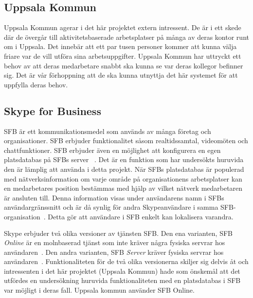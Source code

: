 \documentclass[a4paper,12pt]{article}
\begin{document}
 \subsection{Uppsala Kommun}
 Uppsala Kommun agerar i det här projektet extern intressent. De är i ett skede där de övergår till aktivitetsbaserade arbetsplatser på många av deras kontor runt om i Uppsala. Det innebär att ett par tusen personer kommer att kunna välja friare var de vill utföra sina arbetsuppgifter. Uppsala Kommun har uttryckt ett behov av att deras medarbetare snabbt ska kunna se var deras kollegor befinner sig. Det är vår förhoppning att de ska kunna utnyttja det här systemet för att uppfylla deras behov.

 \subsection{Skype for Business}\label{SFB}
 SFB är ett kommunikationsmedel som används av många företag och organisationer. SFB erbjuder funktionalitet såsom realtidssamtal, videomöten och chattfunktioner. SFB erbjuder även en möjlighet att konfigurera en egen platsdatabas på SFBs server ~\cite{Microsoft-Office}. Det är en funktion som har undersökts huruvida den är lämplig att använda i detta projekt. När SFBs platsdatabas är populerad med nätverksinformation om varje område på organisationens arbetsplatser kan en medarbetares position bestämmas med hjälp av vilket nätverk medarbetaren är ansluten till. Denna information visas under användarens namn i SFBs användargränssnitt och är då synlig för andra Skypeanvändare i samma SFB-organisation~\cite{SFBpresence}. Detta gör att användare i SFB enkelt kan lokalisera varandra.

 Skype erbjuder två olika versioner av tjänsten SFB. Den ena varianten, SFB \textit{Online} är en molnbaserad tjänst som inte kräver några fysiska servrar hos användaren~\cite{SFBonline}.
 Den andra varianten, SFB \textit{Server} kräver fysiska servrar hos användaren~\cite{SFBserver}. Funktionaliteten för de två olika versionerna skiljer sig delvis åt och intressenten i det här projektet (Uppsala Kommun) hade som önskemål att det utfördes en undersökning huruvida funktionaliteten med en platsdatabas i SFB var möjligt i deras fall. Uppsala kommun använder SFB Online.
\end{document}
